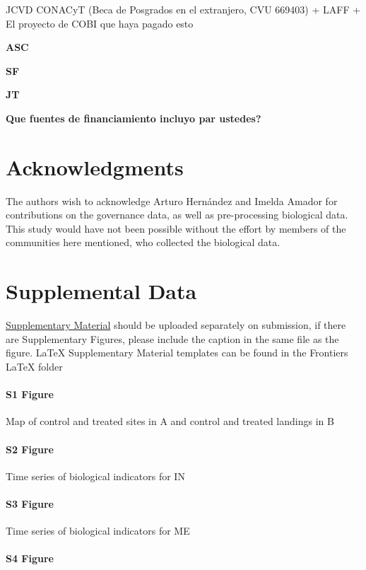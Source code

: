 \documentclass{frontiersSCNS}
\begin{document}
JCVD CONACyT (Beca de Posgrados en el extranjero, CVU 669403) + LAFF +
El proyecto de COBI que haya pagado esto

\textbf{ASC}

\textbf{SF}

\textbf{JT}

\textbf{Que fuentes de financiamiento incluyo par ustedes?}

\section*{Acknowledgments}

The authors wish to acknowledge Arturo Hernández and Imelda Amador for
contributions on the governance data, as well as pre-processing
biological data. This study would have not been possible without the
effort by members of the communities here mentioned, who collected the
biological data.

\section*{Supplemental Data}

\href{http://home.frontiersin.org/about/author-guidelines#SupplementaryMaterial}{Supplementary Material}
should be uploaded separately on submission, if there are Supplementary
Figures, please include the caption in the same file as the figure.
LaTeX Supplementary Material templates can be found in the Frontiers
LaTeX folder

\paragraph*{S1 Figure}
\label{S1_Figure}

Map of control and treated sites in A and control and treated landings
in B

\paragraph*{S2 Figure}
\label{S2_Figure}

Time series of biological indicators for IN

\paragraph*{S3 Figure}
\label{S3_Figure}

Time series of biological indicators for ME

\paragraph*{S4 Figure}
\label{S4_Figure}
\end{document}
